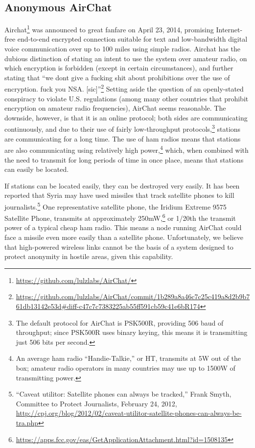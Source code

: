 \documentclass[12pt]{article}
\begin{document}
  \subsection{Anonymous AirChat}
  \label{subsec:airchat}
  
  Airchat\footnote{\url{https://github.com/lulzlabs/AirChat/}} was announced to great fanfare on April 23, 2014, promising Internet-free end-to-end encrypted connection suitable for text and low-bandwidth digital voice communication over up to 100 miles using simple radios. Airchat has the dubious distinction of stating an intent to use the system over amateur radio, on which encryption is forbidden (except in certain circumstances), and further stating that ``we dont give a fucking shit about prohibitions over the use of encryption. fuck you NSA. [sic]''\footnote{\url{https://github.com/lulzlabs/AirChat/commit/1b289a8a46c7c25c419a8d2b9b761db13142e53d\#diff-c47c7c7383225ab55ff591cb59c41e6bR174}} Setting aside the question of an openly-stated conspiracy to violate U.S. regulations (among many other countries that prohibit encryption on amateur radio frequencies), AirChat seems reasonable. The downside, however, is that it is an online protocol; both sides are communicating continuously, and due to their use of fairly low-throughput protocols,\footnote{The default protocol for AirChat is PSK500R, providing 506 baud of throughput; since PSK500R uses binary keying, this means it is transmitting just 506 bits per second.} stations are communicating for a long time. The use of ham radios means that stations are also communicating using relatively high power,\footnote{An average ham radio ``Handie-Talkie,'' or HT, transmits at 5W out of the box; amateur radio operators in many countries may use up to 1500W of transmitting power.} which, when combined with the need to transmit for long periods of time in once place, means that stations can easily be located.
  
  If stations can be located easily, they can be destroyed very easily. It has been reported that Syria may have used missiles that track satellite phones to kill journalists.\footnote{``Caveat utilitor: Satellite phones can always be tracked,'' Frank Smyth, Committee to Protect Journalists, February 24, 2012, \url{http://cpj.org/blog/2012/02/caveat-utilitor-satellite-phones-can-always-be-tra.php}} One representative satellite phone, the Iridium Extreme 9575 Satellite Phone, transmits at approximately 250mW,\footnote{\url{https://apps.fcc.gov/eas/GetApplicationAttachment.html?id=1508135}} or 1/20th the transmit power of a typical cheap ham radio. This means a node running AirChat could face a missile even more easily than a satellite phone. Unfortunately, we believe that high-powered wireless links cannot be the basis of a system designed to protect anonymity in hostile areas, given this capability.
  
\end{document}

